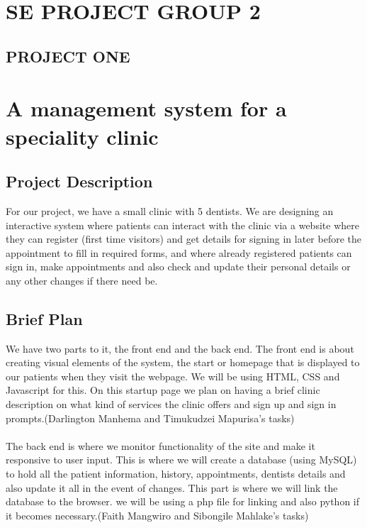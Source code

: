 \documentclass{article}
\begin{document}
\section*{SE PROJECT GROUP 2}
\subsection*{PROJECT ONE}
\section*{A management system for a speciality clinic}

\subsection*{Project Description}

For our project, we have a small clinic with 5 dentists. We are designing an interactive system where patients can interact with the clinic via a website where they can register (first time visitors) and get details for signing in later before the appointment to fill in required forms, and where already registered patients can sign in, make appointments and also check and update their personal details or any other changes if there need be.

\subsection*{Brief Plan}

We have two parts to it, the front end and the back end. The front end is about creating visual elements of the system, the start or homepage that is displayed to our patients when they visit the webpage. We will be using HTML, CSS and Javascript for this.
On this startup page we plan on having a brief clinic description on what kind of services the clinic offers and sign up and sign in prompts.(Darlington Manhema and Timukudzei Mapurisa's tasks)\\\\
The back end is where we monitor functionality of the site and make it responsive to user input. This is where we will create a database (using MySQL) to hold all the patient information, history, appointments, dentists details and also update it all in the event of changes. This part is where we will link the database to the browser. we will be using a php file for linking and also python if it becomes necessary.(Faith Mangwiro and Sibongile Mahlake's tasks)
\end{document}
